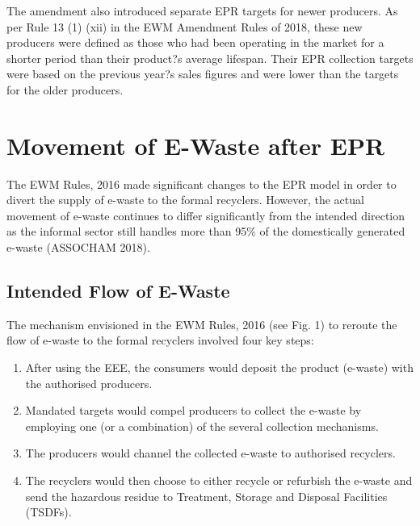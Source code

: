 \documentclass[a4paper, 12pt]{article}
\begin{document}
                    The amendment also introduced separate EPR targets for newer producers. As per Rule 13 (1) (xii) in the EWM Amendment Rules of 2018, these new producers were defined as those who had been operating in the market for a shorter period than their product?s average lifespan. Their EPR collection targets were based on the previous year?s sales figures and were lower than the targets for the older producers. \\
                    
                    
                    
                    \section{Movement of E-Waste after EPR}
                    
                    The EWM Rules, 2016 made significant changes to the EPR model in order to divert the supply of e-waste to the formal recyclers. However, the actual movement of e-waste continues to differ significantly from the intended direction as the informal sector still handles more than 95\% of the domestically generated e-waste (ASSOCHAM 2018).\\
                    
                    
                    \subsection{Intended Flow of E-Waste}
                    
                    The mechanism envisioned in the EWM Rules, 2016 (see Fig. 1) to reroute the flow of e-waste to the formal recyclers involved four key steps:\\
                    
                    \begin{enumerate}
                      \item After using the EEE, the consumers would deposit the product (e-waste) with the authorised producers.
                      \item Mandated targets would compel producers to collect the e-waste by employing one (or a combination) of the several collection mechanisms. 
                      \item The producers would channel the collected e-waste to authorised recyclers.
                      \item The recyclers would then choose to either recycle or refurbish the e-waste and send the hazardous residue to Treatment, Storage and Disposal Facilities (TSDFs).
                    \end{enumerate}
                    
\end{document}
